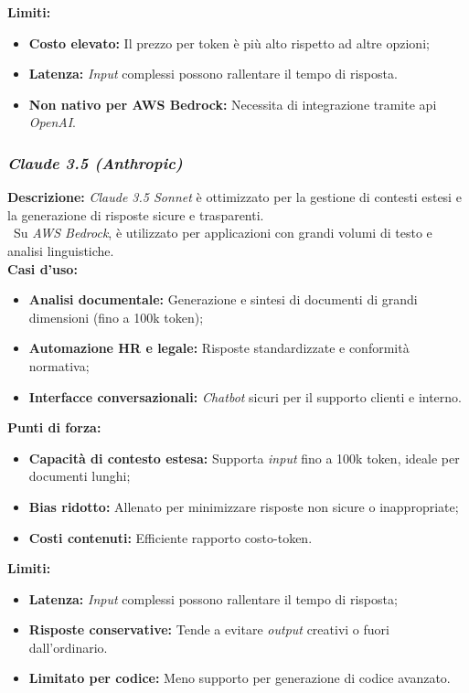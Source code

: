 \noindent \textbf{Limiti:}
\begin{itemize}
    \item \textbf{Costo elevato:} Il prezzo per \gls{token} è più alto rispetto ad altre opzioni;
    \item \textbf{Latenza:} \textit{Input} complessi possono rallentare il tempo di risposta.
    \item \textbf{Non nativo per AWS Bedrock:} Necessita di integrazione tramite \gls{api} \textit{OpenAI}.
\end{itemize}

\subsubsection{\textit{Claude 3.5 (Anthropic)}}

\noindent \textbf{Descrizione:}
\textit{Claude 3.5 Sonnet} è ottimizzato per la gestione di contesti estesi e la generazione di risposte sicure e trasparenti. \\\
Su \textit{AWS Bedrock}, è utilizzato per applicazioni con grandi volumi di testo e analisi linguistiche. \\

\noindent \textbf{Casi d’uso:}
\begin{itemize}
    \item \textbf{Analisi documentale:} Generazione e sintesi di documenti di grandi dimensioni (fino a 100k \gls{token});
    \item \textbf{Automazione HR e legale:} Risposte standardizzate e conformità normativa;
    \item \textbf{Interfacce conversazionali:} \textit{Chatbot} sicuri per il supporto clienti e interno.
\end{itemize}

\noindent \textbf{Punti di forza:}
\begin{itemize}
    \item \textbf{Capacità di contesto estesa:} Supporta \textit{input} fino a 100k \gls{token}, ideale per documenti lunghi;
    \item \textbf{Bias ridotto:} Allenato per minimizzare risposte non sicure o inappropriate;
    \item \textbf{Costi contenuti:} Efficiente rapporto costo-token.
\end{itemize}

\noindent \textbf{Limiti:}
\begin{itemize}
    \item \textbf{Latenza:} \textit{Input} complessi possono rallentare il tempo di risposta;
    \item \textbf{Risposte conservative:} Tende a evitare \textit{output} creativi o fuori dall’ordinario.
    \item \textbf{Limitato per codice:} Meno supporto per generazione di codice avanzato.
\end{itemize}

